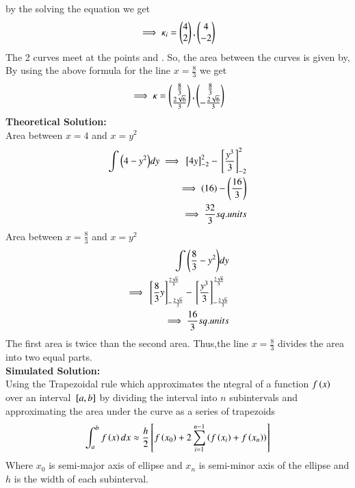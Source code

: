 \documentclass[journal]{IEEEtran}
\begin{document}
by the solving the equation we get
\begin{align}	
	\implies \kappa_i = \begin{pmatrix} 4\\2\end{pmatrix} , \begin{pmatrix}4\\ -2\end{pmatrix}
\end{align}
The 2 curves meet at the points  and . So, the area between the curves is given by,\\
By using the above formula for the line $x=\frac{8}{3}$ we get\\
\begin{align}	
	\implies \kappa=\begin{pmatrix}\frac{8}{3} \\ \frac{2\sqrt{6}}{3}\end{pmatrix}, \begin{pmatrix}\frac{8}{3} \\ -\frac{2\sqrt{6}}{3}\end{pmatrix}
\end{align}
\textbf{Theoretical Solution:}\\
Area between $x=4$ and $x=y^2$
\begin{align}
	\int{\ensuremath{\left(4 - y^2\right)}}dy
    \implies {}\left[4y\right]_{-2}^{2} -{}\left[\frac{y^3}{3}\right]_{-2}^{2}\\
	\implies \left(16\right) - \left(\frac{16}{3}\right)\\
	\implies \frac{32}{3} sq.units
\end{align}
Area between $x=\frac{8}{3}$ and $x=y^2$
\begin{align}
	\int{\ensuremath{\left(\frac{8}{3} - y^2\right)}}dy\\
	\implies {}\left[\frac{8}{3}y\right]_{-\frac{2\sqrt{6}}{3}}^{\frac{2\sqrt{6}}{3}} - {}\left[\frac{y^3}{3}\right]_{-\frac{2\sqrt{6}}{3}}^{\frac{2\sqrt{6}}{3}}\\
	\implies \frac{16}{3} sq.units
\end{align}
The first area is twice than the second area. Thus,the line $x=\frac{8}{3}$ divides the area into two equal parts.\\   
\textbf{Simulated Solution:}\\
Using the Trapezoidal rule which approximates the ntegral of a function $f\left(x\right)$ over an interval ${}\left[a,b\right]$ by dividing the interval into $n$ subintervals and approximating the area under the curve as a series of trapezoids
\begin{align}
    \int_a^b f\left(x\right)dx\approx\frac{h}{2}{}\left[f\left(x_0\right)+2\sum_{i=1}^{n-1}\left(f\left(x_i\right)+f\left(x_n\right)\right)\right]
\end{align}
Where $x_0$ is semi-major axis of ellipse and $x_n$ is semi-minor axis of the ellipse and $h$ is the width of each subinterval.
\end{document}
